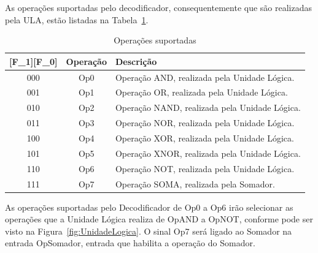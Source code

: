 \documentclass[a4paper,11pt]{report}
\begin{document}
As operações suportadas pelo decodificador, consequentemente que são realizadas pela ULA, estão listadas na Tabela~\ref{tab:decod_operacoes}.

\begin{table}[H]
\centering
\caption{Operações suportadas} %
\begin{tabular}{ccl} %
\hline %
[F\_2][F\_1][F\_0] & Operação & Descrição \\ %
\hline
\hline
000 & Op0 & Operação AND, realizada pela Unidade Lógica. \\
001 & Op1 & Operação OR, realizada pela Unidade Lógica.  \\
010 & Op2 & Operação NAND, realizada pela Unidade Lógica. \\
011 & Op3 & Operação NOR, realizada pela Unidade Lógica.  \\
100 & Op4 & Operação XOR, realizada pela Unidade Lógica.  \\
101 & Op5 & Operação XNOR, realizada pela Unidade Lógica. \\
110 & Op6 & Operação NOT, realizada pela Unidade Lógica.  \\
111 & Op7 & Operação SOMA, realizada pela Somador. \\
\hline
\end{tabular}
\label{tab:decod_operacoes}
\end{table}

As operações suportadas pelo Decodificador de Op0 a Op6 irão selecionar as operações que a Unidade Lógica realiza de OpAND a OpNOT, conforme pode ser visto na Figura~\ref{fig:UnidadeLogica}. O sinal Op7 será ligado ao Somador na entrada OpSomador, entrada que habilita a operação do Somador.
\end{document}
